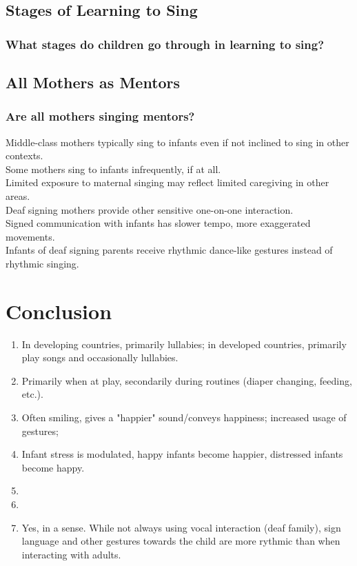 \documentclass{beamer}
\begin{document}
\subsection*{Stages of Learning to Sing}

\begin{frame}
	\frametitle{What stages do children go through in learning to sing?}
\end{frame}

\subsection*{All Mothers as Mentors}
\begin{frame}
	\frametitle{Are all mothers singing mentors?}
	Middle-class mothers typically sing to infants even if not inclined to sing in other contexts.\\
	Some mothers sing to infants infrequently, if at all.\\
	Limited exposure to maternal singing may reflect limited caregiving in other areas.\\
	\pause %
	Deaf signing mothers provide other sensitive one-on-one interaction.\\
	Signed communication with infants has slower tempo, more exaggerated movements.\\
	Infants of deaf signing parents receive rhythmic dance-like gestures instead of rhythmic singing.\\
\end{frame}

\section{Conclusion}
\begin{frame}
	\begin{enumerate}
		\item In developing countries, primarily lullabies; in developed countries, primarily play songs and occasionally lullabies.
		\item Primarily when at play, secondarily during routines (diaper changing, feeding, etc.).
		\item Often smiling, gives a "happier" sound/conveys happiness; increased usage of gestures; %
		\item Infant stress is modulated, happy infants become happier, distressed infants become happy.
		\item %
		\item %
		\item Yes, in a sense. While not always using vocal interaction (deaf family), sign language and other gestures towards the child are more rythmic than when interacting with adults.
	\end{enumerate}
\end{frame}
\end{document}

